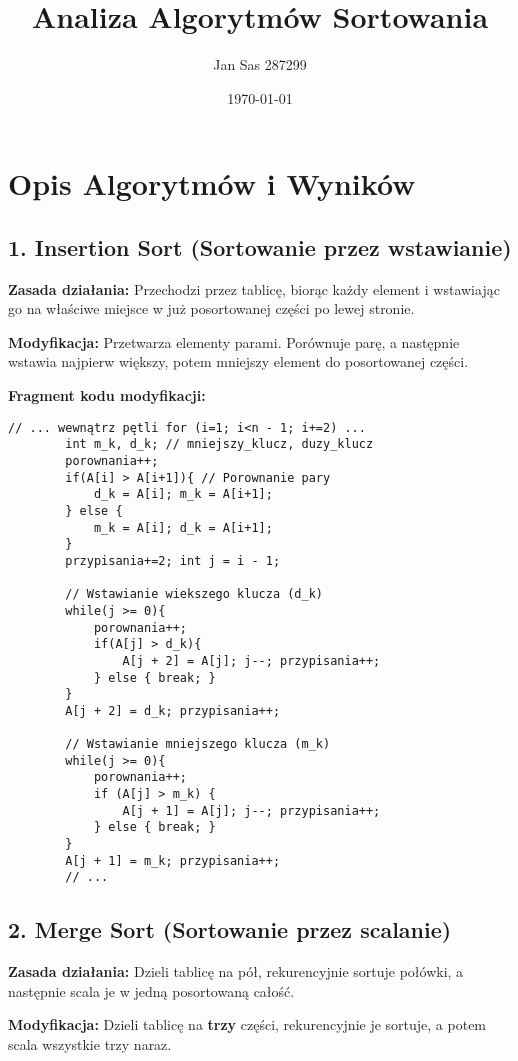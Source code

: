 \documentclass[12pt, a4paper]{article} %
\title{Analiza Algorytmów Sortowania}
\author{Jan Sas 287299}
\date{\today}
\begin{document}
	\maketitle
	\newpage
	
	\section*{Opis Algorytmów i Wyników}
	
	\subsection*{1. Insertion Sort (Sortowanie przez wstawianie)}
	\textbf{Zasada działania:} Przechodzi przez tablicę, biorąc każdy element i wstawiając go na właściwe miejsce w już posortowanej części po lewej stronie.
	
	\textbf{Modyfikacja:} Przetwarza elementy parami. Porównuje parę, a następnie wstawia najpierw większy, potem mniejszy element do posortowanej części.
	
	\textbf{Fragment kodu modyfikacji:}
	\begin{lstlisting}[caption={Fragment modyfikacji Insertion Sort - obsługa pary}, label={lst:insertmod}]
		// ... wewnątrz pętli for (i=1; i<n - 1; i+=2) ...
		int m_k, d_k; // mniejszy_klucz, duzy_klucz
		porownania++;
		if(A[i] > A[i+1]){ // Porownanie pary
			d_k = A[i]; m_k = A[i+1];
		} else {
			m_k = A[i]; d_k = A[i+1];
		}
		przypisania+=2; int j = i - 1;
		
		// Wstawianie wiekszego klucza (d_k)
		while(j >= 0){
			porownania++;
			if(A[j] > d_k){
				A[j + 2] = A[j]; j--; przypisania++;
			} else { break; }
		}
		A[j + 2] = d_k; przypisania++;
		
		// Wstawianie mniejszego klucza (m_k)
		while(j >= 0){
			porownania++;
			if (A[j] > m_k) {
				A[j + 1] = A[j]; j--; przypisania++;
			} else { break; }
		}
		A[j + 1] = m_k; przypisania++;
		// ...
	\end{lstlisting}
	
	\newpage
	\subsection*{2. Merge Sort (Sortowanie przez scalanie)}
	\textbf{Zasada działania:} Dzieli tablicę na pół, rekurencyjnie sortuje połówki, a następnie scala je w jedną posortowaną całość.
	
	\textbf{Modyfikacja:} Dzieli tablicę na \textbf{trzy} części, rekurencyjnie je sortuje, a potem scala wszystkie trzy naraz.
	
\end{document}
